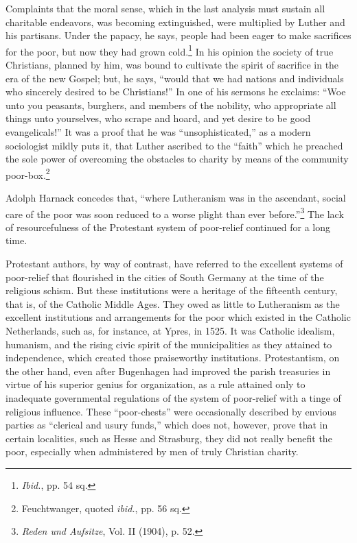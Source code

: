Complaints that the moral sense, which in the last analysis must
sustain all charitable endeavors, was becoming extinguished, were
multiplied by Luther and his partisans. Under the papacy, he says,
people had been eager to make sacrifices for the poor, but now they
had grown cold.\footnote{\textit{Ibid.}, pp. 54 sq.}
 In his opinion the society of true Christians,
planned by him, was bound to cultivate the spirit of sacrifice in the
era of the new Gospel; but, he says, “would that we had nations and
individuals who sincerely desired to be Christians!” In one of his
sermons he exclaims: “Woe unto you peasants, burghers, and members of
the nobility, who appropriate all things unto yourselves, who
scrape and hoard, and yet desire to be good evangelicals!” It was a
proof that he was “unsophisticated,” as a modern sociologist mildly
puts it, that Luther ascribed to the “faith” which he preached the
sole power of overcoming the obstacles to charity by means of the
community poor-box.\footnote{Feuchtwanger, quoted \textit{ibid.}, pp. 56 sq.}

Adolph Harnack concedes that, “where Lutheranism was in the
ascendant, social care of the poor was soon reduced to a worse plight
than ever before.”\footnote{\textit{Reden und Aufsitze}, Vol. II (1904), p. 52.}
 The lack of resourcefulness of the Protestant
system of poor-relief continued for a long time.

Protestant authors, by way of contrast, have referred to the excellent
systems of poor-relief that flourished in the cities of South Germany at the
time of the religious schism. But these institutions were a heritage of the
fifteenth century, that is, of the Catholic Middle Ages. They owed as little
to Lutheranism as the excellent institutions and arrangements for the poor
which existed in the Catholic Netherlands, such as, for instance, at Ypres,
in 1525. It was Catholic idealism, humanism, and the rising civic spirit of
the municipalities as they attained to independence, which created those
praiseworthy institutions. Protestantism, on the other hand, even after
Bugenhagen had improved the parish treasuries in virtue of his superior genius
for organization, as a rule attained only to inadequate governmental regulations
of the system of poor-relief with a tinge of religious influence. These
“poor-chests” were occasionally described by envious parties as “clerical and
usury funds,” which does not, however, prove that in certain localities, such
as Hesse and Strasburg, they did not really benefit the poor, especially when
administered by men of truly Christian charity.

